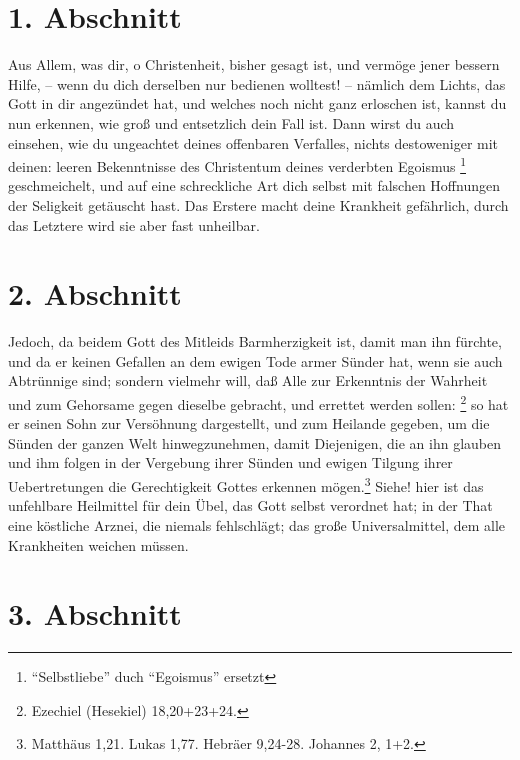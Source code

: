 \section{1. Abschnitt}  \label{kap2_ab1}

Aus Allem, was dir, o Christenheit, bisher gesagt ist, und vermöge jener bessern
Hilfe, -- wenn du dich derselben nur bedienen wolltest! -- nämlich dem Lichts,
das Gott in dir angezündet hat, und welches noch nicht ganz erloschen ist,
kannst du nun erkennen, wie groß und entsetzlich dein Fall ist. Dann wirst du
auch einsehen, wie du ungeachtet deines offenbaren Verfalles, nichts
destoweniger mit deinen: leeren Bekenntnisse des Christentum deines verderbten
Egoismus \footnote{``Selbstliebe'' duch ``Egoismus'' ersetzt} geschmeichelt, 
und auf eine schreckliche Art dich selbst mit
falschen Hoffnungen der Seligkeit getäuscht hast. Das Erstere macht deine
Krankheit gefährlich, durch das Letztere wird sie aber fast unheilbar.

\section{2. Abschnitt}  \label{kap2_ab2}

Jedoch, da beidem Gott des Mitleids Barmherzigkeit ist, damit man ihn
fürchte, und da er keinen Gefallen an dem ewigen Tode armer Sünder hat, wenn
sie auch Abtrünnige sind; sondern vielmehr will, daß Alle zur Erkenntnis der
Wahrheit und zum Gehorsame gegen dieselbe gebracht, und errettet werden
sollen: \footnote{Ezechiel (Hesekiel) 18,20+23+24.}
 so hat er seinen Sohn zur Versöhnung
dargestellt, und zum Heilande gegeben, um die Sünden der ganzen Welt
hinwegzunehmen, damit Diejenigen, die an ihn glauben und ihm folgen in der
Vergebung ihrer Sünden und ewigen Tilgung ihrer Uebertretungen die
Gerechtigkeit Gottes erkennen mögen.\footnote{Matthäus 1,21. Lukas 1,77. Hebräer
9,24-28. Johannes 2, 1+2.}
 
Siehe! hier ist das unfehlbare Heilmittel für dein
Übel, das Gott selbst verordnet hat; in der That eine köstliche Arznei, die
niemals fehlschlägt; das große Universalmittel, dem alle Krankheiten weichen
müssen.

\section{3. Abschnitt}  \label{kap2_ab3}

